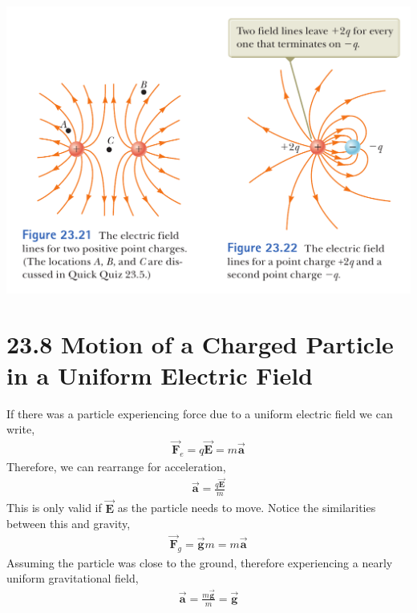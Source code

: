 \documentclass[12pt, titlepage, oneside]{article}
\let\oldvec\vec
\renewcommand{\vec}[1]{\oldvec{\bm{#1}}}
\begin{document}
\begin{center}
	\includegraphics[scale=0.32]{3.png}
\end{center}
\section*{23.8 Motion of a Charged Particle in a Uniform Electric Field}
If there was a particle experiencing force due to a uniform electric field we can write,
\begin{align*}
\vec{F}_e = q \vec{E} = m\vec{a}
\end{align*}
Therefore, we can rearrange for acceleration,
\begin{align*}
\vec{a} = \frac{q\vec{E}}{m}
\end{align*}
This is only valid if $\vec{E}$ as the particle needs to move. Notice the similarities between this and gravity,
\begin{align*}
\vec{F}_g = \vec{g}m = m\vec{a}
\end{align*}
Assuming the particle was close to the ground, therefore experiencing a nearly uniform gravitational field,
\begin{align*}
\vec{a} = \frac{m \vec{g}}{m} = \vec{g}
\end{align*}
\end{document}
